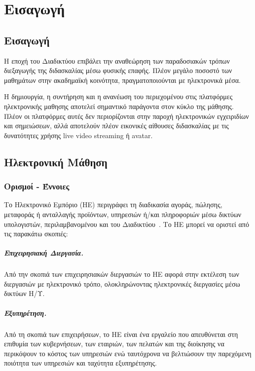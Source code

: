 \documentclass[12pt]{report}
\begin{document}
\hypersetup{pageanchor=true}
\clearpage
{}

\chapter{Εισαγωγή}\label{ch1}
\section{Εισαγωγή}
Η εποχή του Διαδικτύου επιβάλει την αναθεώρηση των παραδοσιακών τρόπων διεξαγωγής της διδασκαλίας μέσω φυσικής επαφής. Πλέον μεγάλο ποσοστό των μαθημάτων στην ακαδημαϊκή κοινότητα, πραγματοποιούνται με ηλεκτρονικά μέσα.

Η δημιουργία, η συντήρηση και η ανανέωση του περιεχομένου στις πλατφόρμες ηλεκτρονικής μαθησης αποτελεί σημαντικό παράγοντα στον κύκλο της μάθησης. Πλέον οι πλατφόρμες αυτές δεν περιορίζονται στην παροχή ηλεκτρονικών εγχειριδίων και σημειώσεων, αλλά αποτελούν πλέον εικονικές αίθουσες διδασκαλίας με τις δυνατότητες χρήσης \textlatin{live video streaming} ή \textlatin{avatar}.

\section{Ηλεκτρονική Μάθηση}
\subsection{Ορισμοί - Έννοιες}
Το Ηλεκτρονικό Εμπόριο (ΗΕ) περιγράφει τη διαδικασία αγοράς, πώλησης, μεταφοράς ή ανταλλαγής προϊόντων, υπηρεσιών ή/και πληροφοριών μέσω δικτύων υπολογιστών, περιλαμβανομένου και του Διαδικτύου~\cite{turban_outland_king_lee_liang_turban_2018}. Το ΗΕ μπορεί να οριστεί από τις παρακάτω σκοπιές:
  \paragraph{Επιχειρησιακή Διεργασία.} Από την σκοπιά των επιχειρησιακών διεργασιών το ΗΕ αφορά στην εκτέλεση των διεργασιών με ηλεκτρονικό τρόπο, ολοκληρώνοντας ηλεκτρονικές διεργασίες μέσω δικτύων Η/Υ.
  \paragraph{Εξυπηρέτηση.} Από τη σκοπιά των επιχειρήσεων, το ΗΕ είναι ένα εργαλείο που απευθύνεται στη επιθυμία των κυβερνήσεων, των εταιριών, των πελατών και της διοίκησης να περικόψουν το κόστος των υπηρεσιών ενώ ταυτόχρονα να βελτιώσουν την παρεχόμενη ποιότητα των υπηρεσιών και ταχύτητα εξυπηρέτησης.
\end{document}
